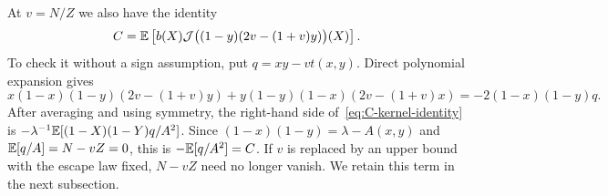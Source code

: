 At $v=N/Z$ we also have the identity
\begin{equation}\label{eq:C-kernel-identity}
 C=\mathbb E\left[b(X)\mathcal J\bigl((1-y)(2v-(1+v)y)\bigr)(X)\right].
\end{equation}
To check it without a sign assumption, put $q=xy-vt(x,y)$. Direct polynomial expansion gives
\[
 x(1-x)(1-y)(2v-(1+v)y)
 +y(1-y)(1-x)(2v-(1+v)x)
 =-2(1-x)(1-y)q.
\]
After averaging and using symmetry, the right-hand side of~\eqref{eq:C-kernel-identity} is
$-\lambda^{-1}\mathbb E[(1-X)(1-Y)q/A^2]$.
Since $(1-x)(1-y)=\lambda-A(x,y)$ and $\mathbb E[q/A]=N-vZ=0$, this is $-\mathbb E[q/A^2]=C$. If $v$ is replaced by an upper bound with the escape law fixed, $N-vZ$ need no longer vanish. We retain this term in the next subsection.
